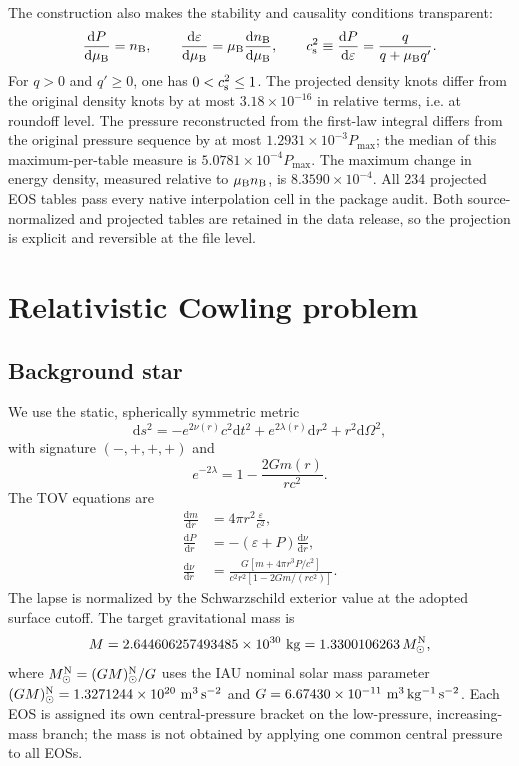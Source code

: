 \documentclass[aps,prd,twocolumn,superscriptaddress,nofootinbib]{revtex4-2}
\newcommand{\MsunN}{M_{\odot}^{\rm N}}
\newcommand{\eps}{\varepsilon}
\newcommand{\mub}{\mu_{\rm B}}
\newcommand{\nb}{n_{\rm B}}
\newcommand{\cs}{c_{\rm s}}
\newcommand{\dd}{\mathrm{d}}
\begin{document}
The construction also makes the stability and causality conditions transparent:
\begin{equation}
\frac{\dd P}{\dd\mub}=\nb,\qquad
\frac{\dd\eps}{\dd\mub}=\mub\frac{\dd\nb}{\dd\mub},\qquad
\cs^2\equiv\frac{\dd P}{\dd\eps}
=\frac{q}{q+\mub q'}.
\label{eq:causality}
\end{equation}
For $q>0$ and $q'\geq0$, one has $0<\cs^2\leq1$. The projected density knots differ from the original density knots by at most $3.18\times10^{-16}$ in relative terms, i.e. at roundoff level. The pressure reconstructed from the first-law integral differs from the original pressure sequence by at most $1.2931\times10^{-3}P_{\max}$; the median of this maximum-per-table measure is $5.0781\times10^{-4}P_{\max}$. The maximum change in energy density, measured relative to $\mub\nb$, is $8.3590\times10^{-4}$. All 234 projected EOS tables pass every native interpolation cell in the package audit. Both source-normalized and projected tables are retained in the data release, so the projection is explicit and reversible at the file level.

\section{Relativistic Cowling problem}

\subsection{Background star}

We use the static, spherically symmetric metric
\begin{equation}
\dd s^2=-e^{2\nu(r)}c^2\dd t^2+e^{2\lambda(r)}\dd r^2
       +r^2\dd\Omega^2,
\end{equation}
with signature $(-,+,+,+)$ and
\begin{equation}
e^{-2\lambda}=1-\frac{2Gm(r)}{rc^2}.
\end{equation}
The TOV equations are
\begin{align}
\frac{\dd m}{\dd r}&=4\pi r^2\frac{\eps}{c^2},\\
\frac{\dd P}{\dd r}&=-(\eps+P)\frac{\dd\nu}{\dd r},\\
\frac{\dd\nu}{\dd r}
&=\frac{G\left[m+4\pi r^3P/c^2\right]}
{c^2r^2\left[1-2Gm/(rc^2)\right]}.
\end{align}
The lapse is normalized by the Schwarzschild exterior value at the adopted surface cutoff. The target gravitational mass is
\begin{equation}
M=2.644606257493485\times10^{30}\ {\rm kg}
 =1.3300106263\,\MsunN,
\end{equation}
where $\MsunN=(GM)_\odot^{\rm N}/G$ uses the IAU nominal solar mass parameter $(GM)_\odot^{\rm N}=1.3271244\times10^{20}\ {\rm m^3\,s^{-2}}$ and $G=6.67430\times10^{-11}\ {\rm m^3\,kg^{-1}\,s^{-2}}$. Each EOS is assigned its own central-pressure bracket on the low-pressure, increasing-mass branch; the mass is not obtained by applying one common central pressure to all EOSs.
\end{document}
